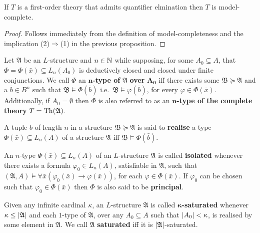 \begin{cor}\label{cor:qemc}
	If $T$ is a first-order theory that admits quantifier elmination then $T$ is model-complete.
\end{cor}
\begin{proof}
	Follows immediately from the definition of model-completeness and the implication (2)$\Rightarrow$(1) in the previous proposition.
\end{proof}

\begin{dfn}[$n$-Type]
	Let $\mathfrak{A}$ be an $L$-structure and $n\in\mathbb{N}$ while supposing, for some $A_0\subseteq A$, that $\Phi=\Phi(\bar{x})\subseteq L_n(A_0)$ is deductively closed and closed under finite conjunctions.  We call $\Phi$ an $\mathbf{n}$\textbf{-type of }$\bm{\mathfrak{A}}$\textbf{ over }$\bm{A_0}$ iff there exists some $\mathfrak{B}\succcurlyeq\mathfrak{A}$ and a $\bar{b}\in B^n$ such that $\mathfrak{B}\models\Phi(\bar{b})$ i.e.\ $\mathfrak{B}\models\varphi(\bar{b})$, for every $\varphi\in\Phi(\bar{x})$.  Additionally, if $A_0=\emptyset$ then $\Phi$ is also referred to as an $\mathbf{n}$\textbf{-type of the complete theory }$T=\operatorname{Th}(\mathfrak{A})$.
\end{dfn}

\begin{dfn}[Realisation]
	A tuple $\bar{b}$ of length $n$ in a structure $\mathfrak{B}\succcurlyeq\mathfrak{A}$ is said to \textbf{realise} a type $\Phi(\bar{x})\subseteq L_n(A)$ of a structure $\mathfrak{A}$ iff $\mathfrak{B}\models\Phi(\bar{b})$.
\end{dfn}

\begin{dfn}
	An $n$-type $\Phi(\bar{x})\subseteq L_n(A)$ of an $L$-structure $\mathfrak{A}$ is called \textbf{isolated} whenever there exists a formula $\varphi_0\in L_n(A)$, satisfiable in $\mathfrak{A}$, such that $(\mathfrak{A},A)\models\forall\bar{x}(\varphi_0(\bar{x})\rightarrow\varphi(\bar{x}))$, for each $\varphi\in\Phi(\bar{x})$.  If $\varphi_0$ can be chosen such that $\varphi_0\in\Phi(\bar{x})$ then $\Phi$ is also said to be \textbf{principal}.
\end{dfn}

\begin{dfn}[Saturation]
	Given any infinite cardinal $\kappa$, an $L$-structure $\mathfrak{A}$ is called $\bm{\kappa}$\textbf{-saturated} whenever $\kappa\leq\left\lvert\mathfrak{A}\right\rvert$ and each $1$-type of $\mathfrak{A}$, over any $A_0\subseteq A$ such that $\left\lvert A_0\right\rvert<\kappa$, is realised by some element in $\mathfrak{A}$.  We call $\mathfrak{A}$ \textbf{saturated} iff it is $\left\lvert\mathfrak{A}\right\rvert$-saturated.
\end{dfn}

